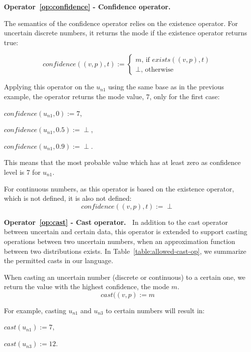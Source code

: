 \bigskip

\noindent\textbf{Operator~\ref{op:confidence} - Confidence operator.~}

The semantics of the confidence operator relies on the existence operator.
For uncertain discrete numbers, it returns the mode if the existence operator returns true:

$$confidence((v, p), t) :=  \begin{cases}
                                            m \text{, if } exists((v, p), t)\\
                                            \perp \text{, otherwise}
                                         \end{cases}$$
                                      
Applying this operator on the $u_{n1}$ using the same base as in the previous example, the operator returns the mode value, 7, only for the first case:
 \begin{itemize*}
    \item[] $confidence(u_{n1}, 0) := 7$,
    \item[] $confidence(u_{n1}, 0.5) := \perp$,
    \item[] $confidence(u_{n1}, 0.9) := \perp$.
\end{itemize*}

This means that the most probable value which has at least zero as confidence level is 7 for $u_{n1}$. 

For continuous numbers, as this operator is based on the existence operator, which is not defined, it is also not defined:
$$confidence((v, p), t) :=  \perp$$

\bigskip

\noindent\textbf{Operator~\ref{op:cast} - Cast operator.~}
In addition to the cast operator between uncertain and certain data, this operator is extended to support casting operations between two uncertain numbers, when an approximation function between two distributions exists.
In Table~\ref{table:allowed-cast-op}, we summarize the permitted casts in our language.

When casting an uncertain number (discrete or continuous) to a certain one, we return the value with the highest confidence, \ie the mode $m$.
$$cast((v, p) := m$$

For example, casting $u_{n1}$ and $u_{n3}$ to certain numbers will result in:
\begin{itemize*}
	\item[] $cast(u_{n1}) := 7$,
	\item[] $cast(u_{n3}) := 12$.
\end{itemize*}

